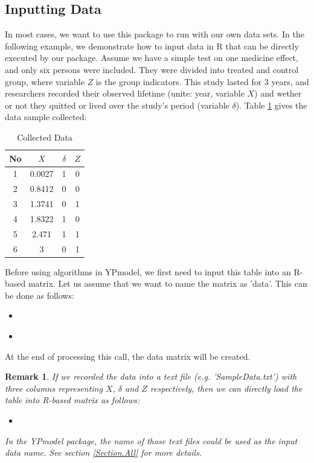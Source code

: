\documentclass[12pt]{article}
\newcommand{\insertcode}[2]{\begin{itemize}\item[]\end{itemize}} %
\newtheorem{remark}{Remark}
\begin{document}
\subsection{Inputting Data}
In most cases, we want to use this package to run with our own data sets. In the following example, we demonstrate how to input data in R that can be directly executed by our package.
Assume we have a simple test on one medicine effect, and only six persons were included.
They were divided into treated and control group, where variable $Z$ is the group indicators.
This study lasted for $3$ years, and researchers recorded their observed lifetime (unite: year, variable $X$) and wether or not they quitted or lived over the study's period (variable $\delta$).
Table \ref{Tab:CollectedData} gives the data sample collected:
\begin{table}[!h]
\renewcommand{\arraystretch}{1.3}
\caption{Collected Data} \label{Tab:CollectedData} \centering
\begin{tabular}{|c||c|c|c|}
  \hline
  No & $X$ & $\delta$ & $Z$ \\
  \hline
  1 & 0.0027 & 1 & 0 \\
  2 & 0.8412 & 0 & 0 \\
  3 & 1.3741 & 0 & 1 \\
  4 & 1.8322 & 1 & 0 \\
  5 & 2.471 & 1 & 1 \\
  6 & 3 & 0 & 1 \\
  \hline
\end{tabular}
\end{table}

Before using algorithms in YPmodel, we first need to input this table into an R-based matrix. Let us assume that we want to name the matrix as 'data'. This can be done as follows:
\insertcode{"Scripts/code1.pl"}{Inputting data.}
\insertcode{"Scripts/result1.pl"}{Results of scripts.}
At the end of processing this call, the data matrix will be created.

\begin{remark}
If we recorded the data into a text file (e.g. 'SampleData.txt') with three columns representing $X$, $\delta$ and $Z$ respectively, then we can directly load the table into R-based matrix as follows:
\insertcode{"Scripts/code2.pl"}{Loading data from text files.}
In the YPmodel package, the name of those text files could be used as the input data name. See section \ref{Section.All} for more details.
\end{remark}
\end{document}
